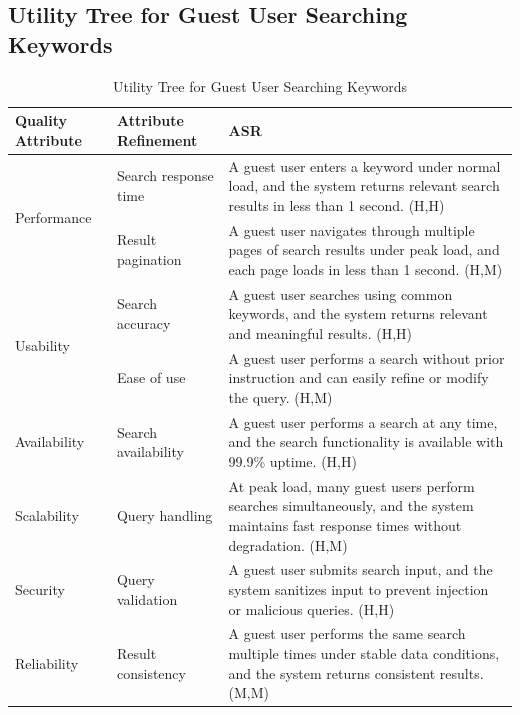 \documentclass{article}
\begin{document}
\subsection{Utility Tree for Guest User Searching Keywords}

\begin{table}[H]
\centering
\caption{Utility Tree for Guest User Searching Keywords}
\begin{tabular}{|p{3cm}|p{4cm}|p{7cm}|}
\hline
\textbf{Quality Attribute} & \textbf{Attribute Refinement} & \textbf{ASR} \\
\hline

\multirow{2}{*}{Performance}
& Search response time
& A guest user enters a keyword under normal load, and the system returns relevant search results in less than 1 second. (H,H) \\
\cline{2-3}
& Result pagination
& A guest user navigates through multiple pages of search results under peak load, and each page loads in less than 1 second. (H,M) \\
\hline

\multirow{2}{*}{Usability}
& Search accuracy
& A guest user searches using common keywords, and the system returns relevant and meaningful results. (H,H) \\
\cline{2-3}
& Ease of use
& A guest user performs a search without prior instruction and can easily refine or modify the query. (H,M) \\
\hline

Availability
& Search availability
& A guest user performs a search at any time, and the search functionality is available with 99.9\% uptime. (H,H) \\
\hline

Scalability
& Query handling
& At peak load, many guest users perform searches simultaneously, and the system maintains fast response times without degradation. (H,M) \\
\hline

Security
& Query validation
& A guest user submits search input, and the system sanitizes input to prevent injection or malicious queries. (H,H) \\
\hline

Reliability
& Result consistency
& A guest user performs the same search multiple times under stable data conditions, and the system returns consistent results. (M,M) \\
\hline

\end{tabular}
\end{table}
\end{document}
